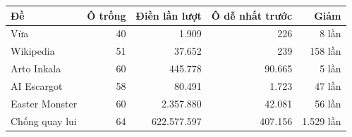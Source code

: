 \begin{tabular}{@{}lrrrr@{}}
\toprule
\textbf{Đề} & \textbf{Ô trống} & \textbf{Điền lần lượt} & \textbf{Ô dễ nhất trước} & \textbf{Giảm} \\
\midrule
Vừa & 40 & 1.909 & 226 & 8 lần \\
Wikipedia & 51 & 37.652 & 239 & 158 lần \\
Arto Inkala & 60 & 445.778 & 90.665 & 5 lần \\
AI Escargot & 58 & 80.491 & 1.723 & 47 lần \\
Easter Monster & 60 & 2.357.880 & 42.081 & 56 lần \\
Chống quay lui & 64 & 622.577.597 & 407.156 & 1.529 lần \\
\bottomrule
\end{tabular}
